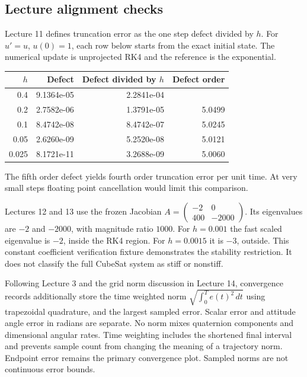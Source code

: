 \subsection{Lecture alignment checks}
Lecture 11 defines truncation error as the one step defect divided by $h$.
For $u'=u$, $u(0)=1$, each row below starts from the exact initial state.
The numerical update is unprojected RK4 and the reference is the exponential.
\begin{center}
\begin{tabular}{rrrr}
$h$ & Defect & Defect divided by $h$ & Defect order \\
\hline
0.4 & 9.1364e-05 & 2.2841e-04 & {} \\
0.2 & 2.7582e-06 & 1.3791e-05 & 5.0499 \\
0.1 & 8.4742e-08 & 8.4742e-07 & 5.0245 \\
0.05 & 2.6260e-09 & 5.2520e-08 & 5.0121 \\
0.025 & 8.1721e-11 & 3.2688e-09 & 5.0060 \\
\end{tabular}
\end{center}
The fifth order defect yields fourth order truncation error per unit time.
At very small steps floating point cancellation would limit this comparison.

Lectures 12 and 13 use the frozen Jacobian
$A=\left(\begin{smallmatrix}-2&0\\400&-2000\end{smallmatrix}\right)$.
Its eigenvalues are $-2$ and $-2000$, with magnitude ratio $1000$.
For $h=0.001$ the fast scaled eigenvalue is $-2$, inside the RK4 region.
For $h=0.0015$ it is $-3$, outside. This constant coefficient verification
fixture demonstrates the stability restriction. It does not classify the
full CubeSat system as stiff or nonstiff.

Following Lecture 3 \cite{goza3} and the grid norm discussion in Lecture 14, convergence
records additionally store the time weighted norm
$\sqrt{\int_0^T e(t)^2\,dt}$ using trapezoidal quadrature, and the largest
sampled error. Scalar error and attitude angle error in radians are separate.
No norm mixes quaternion components and dimensional angular rates.
Time weighting includes the shortened final interval and prevents sample
count from changing the meaning of a trajectory norm. Endpoint error remains
the primary convergence plot. Sampled norms are not continuous error bounds.
